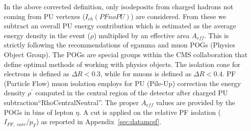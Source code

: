 In the above corrected definition, only isodeposits from charged hadrons not coming from PU vertexes ($I_{ch}(PFnoPU)$) are considered.  From these we subtract an overall PU energy contribution which is estimated as the average energy density in the event ($\rho$) multiplied by an effective area $A_{eff}$. This is strictly following the recommendations of egamma and muon POGs (Physics Object Group). The POGs are special groups within the CMS collaboration that define optimal methods of working with physics objects. The isolation cone for electrons is defined as $\Delta R < 0.3$, while for muons is defined as $\Delta R < 0.4$. PF (Particle Flow) muon isolation employs for PU (Pile-Up) correction the energy density $\rho^\prime$ computed in the central region of the detector after charged PU subtraction``RhoCentralNeutral''. The proper $A_{eff}$ values are provided by the POGs in bins of lepton $\eta$. A cut is applied on the relative PF isolation ($I_{PF, \,\, corr} / p_T$) as reported in Appendix~\ref{sec:datamcsf}.




